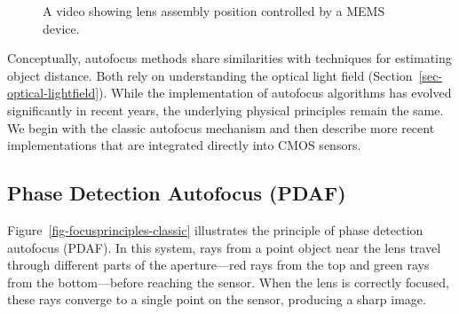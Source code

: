 \documentclass[
  letterpaper,
]{book}
\begin{document}
\begin{figure}


\caption{\label{fig-sensor-mems}A video showing lens assembly position
controlled by a MEMS device.}

\end{figure}%

Conceptually, autofocus methods share similarities with techniques for
estimating object distance. Both rely on understanding the optical light
field (Section~\ref{sec-optical-lightfield}). While the implementation
of autofocus algorithms has evolved significantly in recent years, the
underlying physical principles remain the same. We begin with the
classic autofocus mechanism and then describe more recent
implementations that are integrated directly into CMOS sensors.

\subsection{Phase Detection Autofocus
(PDAF)}\label{sec-phasedetection-autofocus}

Figure~\ref{fig-focusprinciples-classic} illustrates the principle of
phase detection autofocus (PDAF). In this system, rays from a point
object near the lens travel through different parts of the
aperture---red rays from the top and green rays from the bottom---before
reaching the sensor. When the lens is correctly focused, these rays
converge to a single point on the sensor, producing a sharp image.
\end{document}
